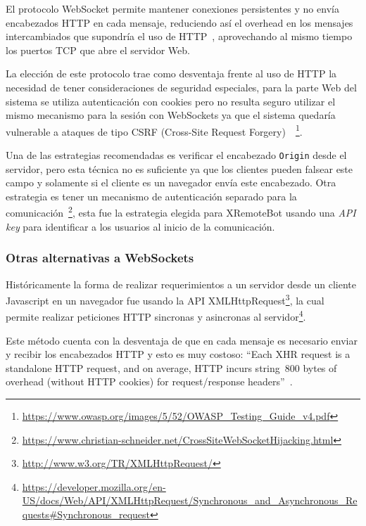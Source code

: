 El protocolo WebSocket permite mantener conexiones persistentes y no envía
encabezados HTTP en cada mensaje, reduciendo así el overhead en los mensajes
intercambiados que supondría el uso de HTTP~\citep{wang_2013}, aprovechando al
mismo tiempo los puertos TCP que abre el servidor Web.

La elección de este protocolo trae como desventaja frente al uso de HTTP la
necesidad de tener consideraciones de seguridad especiales, para la parte
Web del sistema se utiliza autenticación con cookies pero no resulta seguro
utilizar el mismo mecanismo para la sesión con WebSockets ya que el sistema
quedaría vulnerable a ataques de tipo CSRF (Cross-Site Request
Forgery)~\citep{owasp_2014}~\footnote{
\url{https://www.owasp.org/images/5/52/OWASP_Testing_Guide_v4.pdf}}.

Una de las estrategias recomendadas es verificar el encabezado \texttt{Origin}
desde el servidor, pero esta técnica no es suficiente ya que los
clientes pueden falsear este campo y solamente si el cliente es un navegador
envía este encabezado.
Otra estrategia es tener un mecanismo de autenticación
separado para la comunicación~\footnote{\url{https://www.christian-schneider.net/CrossSiteWebSocketHijacking.html}},
esta fue la estrategia elegida para XRemoteBot usando una \textit{API key}
para identificar a los usuarios al inicio de la comunicación.

\subsubsection{Otras alternativas a WebSockets}
Históricamente la forma de realizar requerimientos a un servidor desde un
cliente Javascript en un navegador fue usando la API
XMLHttpRequest\footnote{\url{http://www.w3.org/TR/XMLHttpRequest/}}, la
cual permite realizar peticiones HTTP sincronas y asincronas al
servidor\footnote{\url{https://developer.mozilla.org/en-US/docs/Web/API/XMLHttpRequest/Synchronous_and_Asynchronous_Requests\#Synchronous_request}}.

Este método cuenta con la desventaja de que en cada mensaje es necesario
enviar y recibir los encabezados HTTP y esto es muy costoso:
``Each XHR request is a standalone HTTP request, and on average, HTTP incurs
string~800 bytes of overhead (without HTTP cookies) for request/response
headers''~\citep{grigorik_2013}.

